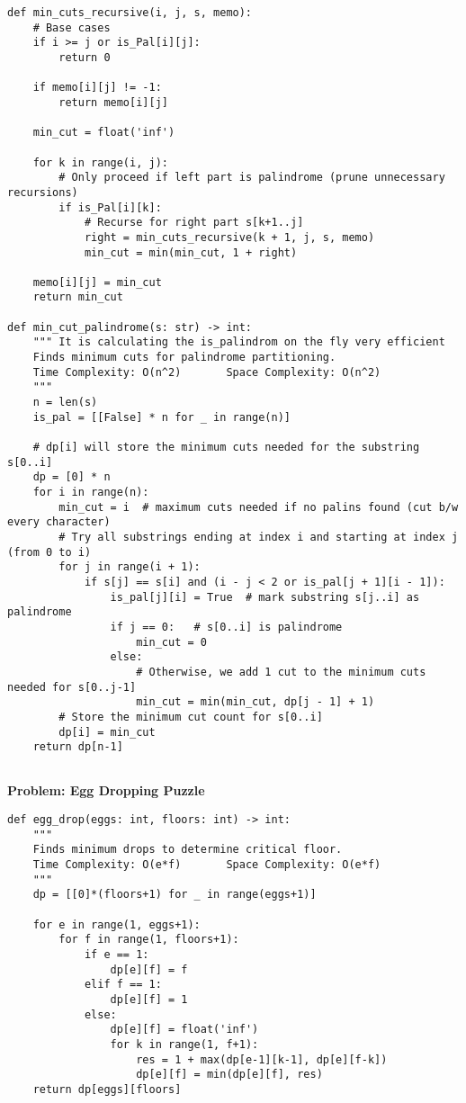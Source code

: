 \begin{verbatim}
def min_cuts_recursive(i, j, s, memo):
    # Base cases
    if i >= j or is_Pal[i][j]:
        return 0

    if memo[i][j] != -1:
        return memo[i][j]

    min_cut = float('inf')

    for k in range(i, j):
        # Only proceed if left part is palindrome (prune unnecessary recursions)
        if is_Pal[i][k]:
            # Recurse for right part s[k+1..j]
            right = min_cuts_recursive(k + 1, j, s, memo)
            min_cut = min(min_cut, 1 + right)

    memo[i][j] = min_cut
    return min_cut
    
def min_cut_palindrome(s: str) -> int:
    """ It is calculating the is_palindrom on the fly very efficient
    Finds minimum cuts for palindrome partitioning.
    Time Complexity: O(n^2)       Space Complexity: O(n^2)
    """
    n = len(s)
    is_pal = [[False] * n for _ in range(n)]
    
    # dp[i] will store the minimum cuts needed for the substring s[0..i]
    dp = [0] * n
    for i in range(n):
        min_cut = i  # maximum cuts needed if no palins found (cut b/w every character)
        # Try all substrings ending at index i and starting at index j (from 0 to i)
        for j in range(i + 1):
            if s[j] == s[i] and (i - j < 2 or is_pal[j + 1][i - 1]):
                is_pal[j][i] = True  # mark substring s[j..i] as palindrome
                if j == 0:   # s[0..i] is palindrome
                    min_cut = 0
                else:
                    # Otherwise, we add 1 cut to the minimum cuts needed for s[0..j-1]
                    min_cut = min(min_cut, dp[j - 1] + 1)
        # Store the minimum cut count for s[0..i]
        dp[i] = min_cut
    return dp[n-1]
    
\end{verbatim}

\noindent\textbf{Problem: Egg Dropping Puzzle}
\begin{verbatim}
def egg_drop(eggs: int, floors: int) -> int:
    """
    Finds minimum drops to determine critical floor.
    Time Complexity: O(e*f)       Space Complexity: O(e*f)
    """
    dp = [[0]*(floors+1) for _ in range(eggs+1)]
    
    for e in range(1, eggs+1):
        for f in range(1, floors+1):
            if e == 1:
                dp[e][f] = f
            elif f == 1:
                dp[e][f] = 1
            else:
                dp[e][f] = float('inf')
                for k in range(1, f+1):
                    res = 1 + max(dp[e-1][k-1], dp[e][f-k])
                    dp[e][f] = min(dp[e][f], res)
    return dp[eggs][floors]
\end{verbatim}

